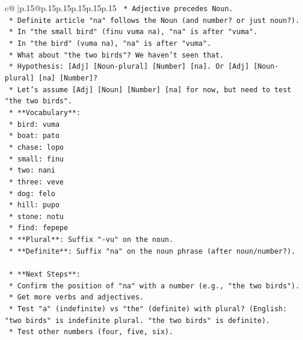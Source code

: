 \documentclass{article}
\begin{document}
{\begin{supertabular}{c@{$\;$}|p{.15\linewidth}@{}p{.15\linewidth}p{.15\linewidth}p{.15\linewidth}p{.15\linewidth}p{.15\linewidth}}
{{{\texttt{            *   Adjective precedes Noun.} \\
\texttt{            *   Definite article "na" follows the Noun (and number? or just noun?).} \\
\texttt{            *   In "the small bird" (finu vuma na), "na" is after "vuma".} \\
\texttt{            *   In "the bird" (vuma na), "na" is after "vuma".} \\
\texttt{            *   What about "the two birds"? We haven't seen that.} \\
\texttt{            *   Hypothesis: {[}Adj{]} {[}Noun{-}plural{]} {[}Number{]} {[}na{]}. Or {[}Adj{]} {[}Noun{-}plural{]} {[}na{]} {[}Number{]}?} \\
\texttt{            *   Let's assume {[}Adj{]} {[}Noun{]} {[}Number{]} {[}na{]} for now, but need to test "the two birds".} \\
\texttt{        *   **Vocabulary**:} \\
\texttt{            *   bird: vuma} \\
\texttt{            *   boat: pato} \\
\texttt{            *   chase: lopo} \\
\texttt{            *   small: finu} \\
\texttt{            *   two: nani} \\
\texttt{            *   three: veve} \\
\texttt{            *   dog: felo} \\
\texttt{            *   hill: pupo} \\
\texttt{            *   stone: notu} \\
\texttt{            *   find: fepepe} \\
\texttt{        *   **Plural**: Suffix "{-}vu" on the noun.} \\
\texttt{        *   **Definite**: Suffix "na" on the noun phrase (after noun/number?).} \\
\\ 
\texttt{    *   **Next Steps**:} \\
\texttt{        *   Confirm the position of "na" with a number (e.g., "the two birds").} \\
\texttt{        *   Get more verbs and adjectives.} \\
\texttt{        *   Test "a" (indefinite) vs "the" (definite) with plural? (English: "two birds" is indefinite plural. "the two birds" is definite).} \\
\texttt{        *   Test other numbers (four, five, six).} \\
}}}
\end{supertabular}}
\end{document}
